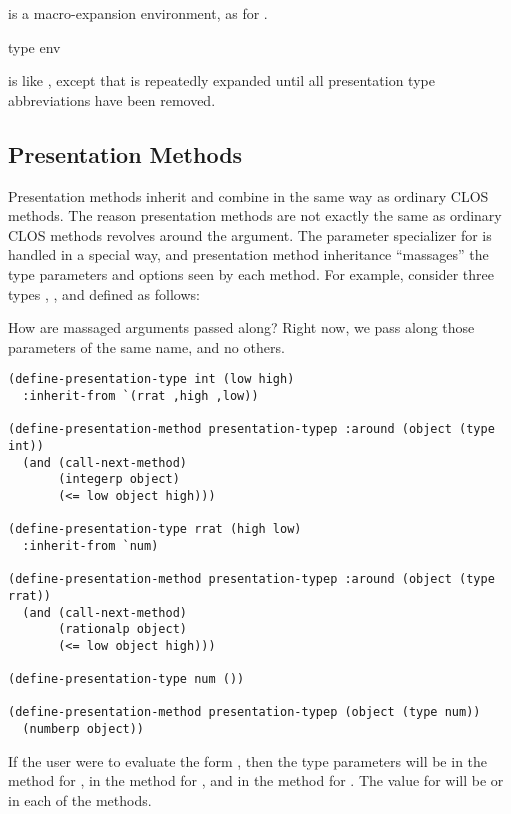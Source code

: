  is a macro-expansion environment, as for .

 {type \optional env}

 is like
, except that  is
repeatedly expanded until all presentation type abbreviations have been removed.


\subsection {Presentation Methods}

Presentation methods inherit and combine in the same way as ordinary CLOS
methods.  The reason presentation methods are not exactly the same as ordinary
CLOS methods revolves around the  argument.  The parameter specializer
for  is handled in a special way, and presentation method inheritance
``massages'' the type parameters and options seen by each method.  For example,
consider three types , , and  defined as follows:

 {How are massaged arguments passed along?  Right now, we pass along
those parameters of the same name, and no others.}

\begin{verbatim}
(define-presentation-type int (low high)
  :inherit-from `(rrat ,high ,low))

(define-presentation-method presentation-typep :around (object (type int))
  (and (call-next-method)
       (integerp object)
       (<= low object high)))

(define-presentation-type rrat (high low)
  :inherit-from `num)

(define-presentation-method presentation-typep :around (object (type rrat))
  (and (call-next-method)
       (rationalp object)
       (<= low object high)))

(define-presentation-type num ())

(define-presentation-method presentation-typep (object (type num))
  (numberp object))
\end{verbatim}

If the user were to evaluate the form ,
then the type parameters will be  in the 
method for ,  in the method for , and  in the
method for .  The value for  will be or  in
each of the methods.


